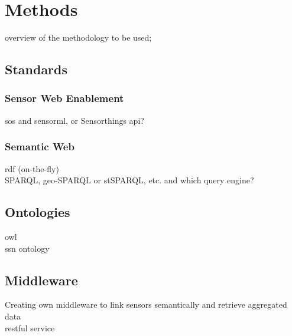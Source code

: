 \chapter{Methods}
\label{chap:methods}

overview of the methodology to be used;

\section{Standards}
\subsection{Sensor Web Enablement}
\ac{sos} and \ac{sensorml}, or Sensorthings \ac{api}? 

\subsection{Semantic Web}
\ac{rdf} (on-the-fly) \\

SPARQL, geo-SPARQL or stSPARQL, etc. and which query engine?


\section{Ontologies}
\ac{owl} \\
\ac{ssn} ontology


\section{Middleware}
Creating own middleware to link sensors semantically and retrieve aggregated data\\

\ac{rest}ful service




